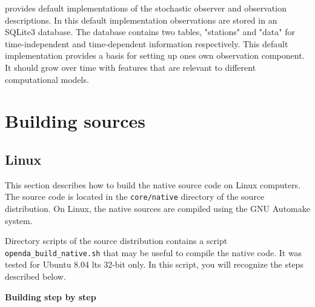\oda provides default implementations of the stochastic observer and observation descriptions. In this default implementation observations are stored in an SQLite3 database. The database contains two tables, "stations" and "data" for time-independent and time-dependent information respectively. This default implementation provides a basis for setting up ones own observation component. It should grow over time with features that are relevant to different computational models. 

\section{Building sources}

\subsection{Linux}\label{sec:buildLinux}

This section describes how to build the \oda native source code on Linux computers. The source code is located in the \verb|core/native| directory of the source distribution. On Linux, the native sources are compiled using the GNU Automake system.

Directory scripts of the source distribution contains a script \verb|openda_build_native.sh| that may be useful to compile the native code. It was tested for Ubuntu 8.04 lts 32-bit only. In this script, you will recognize the steps described below.

\textbf{Building step by step}

